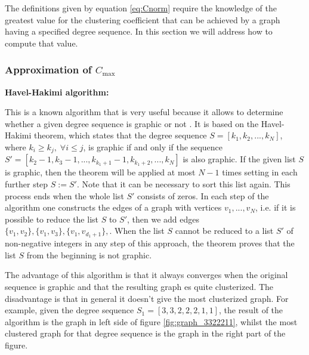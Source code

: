 \documentclass{article}
\begin{document}
The definitions given by equation \ref{eq:Cnorm} require the knowledge of the greatest value for the clustering coefficient that can be achieved by a graph having a specified degree sequence. In this section we will address how to compute that value.

\subsubsection{Approximation of $C_{\mathrm{max}}$}

{\bf Havel-Hakimi algorithm:}

This is a known algorithm that is very useful because it allows to determine whether a given degree sequence is graphic or not \cite{Hakimi1962}. It is based on the Havel-Hakimi theorem, which states that the degree sequence $S = [k_1, k_2, ..., k_N]$, where $k_i \geq k_j,\; \forall i\leq j$, is graphic if and only if the sequence $S' = [k_2-1, k_3-1, ..., k_{k_1+1}-1, k_{k_1+2} ,..., k_N]$ is also graphic. If the given list $S$ is graphic, then the theorem will be applied at most $N-1$ times setting in each further step $S:=S'$. Note that it can be necessary to sort this list again. This process ends when the whole list $S'$ consists of zeros. In each step of the algorithm one constructs the edges of a graph with vertices $v_1, ..., v_N$, i.e. if it is possible to reduce the list $S$ to $S'$, then we add edges $\lbrace v_1, v_2 \rbrace, \lbrace v_1, v_3 \rbrace, \lbrace v_1, v_{d_1+1} \rbrace,$. When the list $S$ cannot be reduced to a list $S'$ of non-negative integers in any step of this approach, the theorem proves that the list $S$ from the beginning is not graphic.

The advantage of this algorithm is that it always converges when the original sequence is graphic and that the resulting graph es quite clusterized. The disadvantage is that in general it doesn't give the most clusterized graph. For example, given the degree sequence $S_1 = [3, 3, 2, 2, 2, 1, 1]$, the result of the algorithm is the graph in left side of figure \ref{fig:graph_3322211}, whilst the most clustered graph for that degree sequence is the graph in the right part of the figure.
\end{document}
